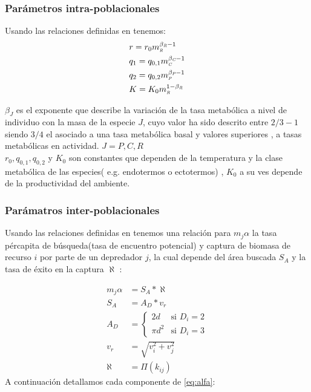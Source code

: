 \subsubsection{Par\'ametros intra-poblacionales}
Usando las relaciones definidas en \cite{savage2004effects} tenemos:
\begin{equation}\label{eq:params3}
\begin{aligned}
&r = r_0m_{\textit{\tiny R}}^{\beta_{\textit{\tiny R}} - 1} \\
&q_1=q_{0,1}m_{\textit{\tiny C}}^{\beta_{\textit{\tiny C}} - 1} \\
&q_2= q_{0,2}m_{\textit{\tiny P}}^{\beta_{\textit{\tiny P}} -1}\\
&K= K_{0}m_{\textit{\tiny R}}^{1-\beta_{\textit{\tiny R}}}
\end{aligned}
\end{equation}

$\beta_J$ es el exponente que describe la variaci\'on de la tasa metab\'olica a nivel de individuo con la masa de la especie $J$, cuyo valor ha sido descrito entre $2/3 - 1$ siendo $3/4$ el asociado a una tasa metab\'olica basal y valores superiores , a tasas metab\'olicas en actividad\citep{pawar2012dimensionality,west1997general,savage2004predominance}. $J = P,C,R$ \\
$r_0,q_{0,1},q_{0,2}$ y $K_0$ son constantes que dependen de la temperatura y la clase metab\'olica de las especies( e.g. endotermos o ectotermos) , $K_0$ a su ves depende de la productividad del ambiente\citep{pawar2012dimensionality}.
\subsubsection{Par\'amatros inter-poblacionales}
Usando las relaciones definidas en \citep{pawar2012dimensionality,kiltie2000scaling,mcgill2006allometric,bejan2006unifying} tenemos una relaci\'on para $m_j\alpha$  la tasa p\'ercapita de b\'usqueda(tasa de encuentro potencial) y captura de biomasa de recurso $i$ por parte de un depredador $j$, la cual depende del \'area buscada $S_A$ y la tasa de \'exito en la captura $\aleph$ :  

\begin{equation}\label{eq:alfa}
\begin{aligned}
 m_j\alpha & =  S_A*\aleph \\
 S_A &=  A_D * v_r \\
A_D &=  \begin{cases} 2d & \text{si } D_i = 2 \\ \pi d^2 & \text{si } D_i = 3 \end{cases}\\
v_r &= \sqrt{v_i^2 +v_j^2}\\
\aleph &= \Pi(k_{ij})
\end{aligned}
\end{equation}
A continuaci\'on detallamos cada componente de \eqref{eq:alfa}:\\


